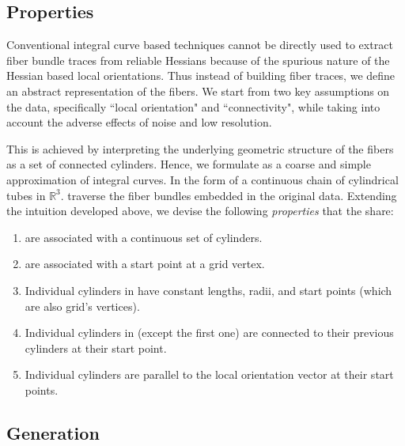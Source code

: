 \subsection{\mt Properties}\label{subsec:mt_properties}
Conventional integral curve based techniques cannot be directly used to extract fiber bundle traces from reliable Hessians because of the spurious nature of the Hessian based local orientations.
Thus instead of building fiber traces, we define an abstract representation of the fibers.
We start from two key assumptions on the data, specifically ``local orientation" and ``connectivity", while taking into account the adverse effects of noise and low resolution.

This is achieved by interpreting the underlying geometric structure of the fibers as a set of connected cylinders. 
Hence, we formulate \mt as a coarse and simple approximation of integral curves. In the form of a continuous chain of cylindrical tubes in $\mathbb{R}^3$. \mt traverse the fiber bundles embedded in the original data. Extending the intuition developed above, 
we devise the following \textit{properties} that the \mt share:
\begin{enumerate}
	\item{\mt are associated with a continuous set of cylinders.}
	\item{\mt are associated with a start point at a grid vertex.}
	\item{Individual cylinders in \mt have constant lengths, radii, and start points (which are also grid's vertices).}
	\item{Individual cylinders in \mt (except the first one) are connected to their previous cylinders at their start point.}
	\item{Individual cylinders are parallel to the local orientation vector at their start points.}
\end{enumerate} 

\subsection{\mt Generation}\label{subsec:mt_generation}

